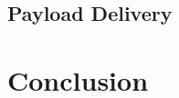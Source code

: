 \documentclass[]{auvsi_doc}
\begin{document}
\subsection{Payload Delivery}
\section{Conclusion}

\end{document}
